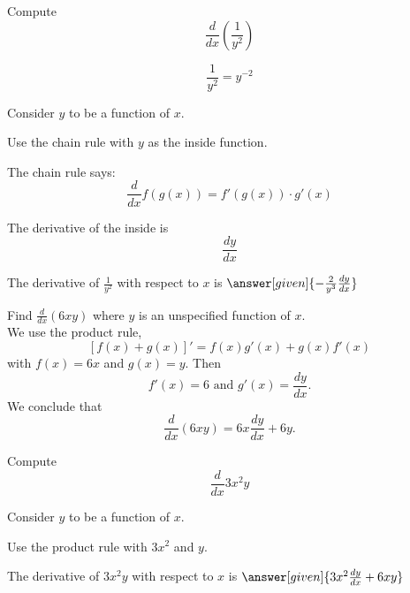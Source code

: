 \documentclass{ximera}
\begin{document}
\begin{question} %
  Compute
  \[
  \frac{d}{dx} \left( \frac{1}{y^2} \right)
  \]
  
	  \begin{hint}
      \[\frac{1}{y^2} = y^{-2}\]
    \end{hint}
    \begin{hint}
      Consider $y$ to be a function of $x$.
    \end{hint}
    \begin{hint}
      Use the chain rule with $y$ as the inside function.
    \end{hint}
    \begin{hint}
      The chain rule says:
      \[
      \frac{d}{dx} f(g(x)) = f'(g(x))\cdot g'(x)
      \]
    \end{hint}
    \begin{hint}
      The derivative of the inside is 
      \[
      \frac{dy}{dx}
      \]
    \end{hint}
    
		The derivative of $\frac{1}{y^2}$ with respect to $x$ is
		 $\answer[given]{-\frac{2}{y^3} \frac{dy}{dx}}$
		
\end{question}


\begin{example} %
Find $\frac{d}{dx} (6xy)$ where $y$ is an unspecified function of $x$.\\
We use the product rule,
\[\displaystyle{[f(x) + g(x)]' = f(x)g'(x) + g(x)f'(x)}\]
with $f(x) = 6x$ and $g(x) = y$. Then 
\[f'(x) = 6 \text{ and } g'(x) = \frac{dy}{dx}.\]
We conclude that
\[\frac{d}{dx} (6xy) = 6x \frac{dy}{dx} + 6y.\]
\end{example}



\begin{center}
\begin{foldable}
\end{foldable}
\end{center}


\begin{question} %
  Compute
  \[
  \frac{d}{dx} 3x^2y
  \]
  
	  
    \begin{hint}
      Consider $y$ to be a function of $x$.
    \end{hint}
		\begin{hint}
      Use the product rule with $3x^2$ and $y$.
    \end{hint}
    
    
		The derivative of $3x^2y$ with respect to $x$ is
		 $\answer[given]{3x^2  \frac{dy}{dx} + 6xy}$
		
\end{question}
\end{document}
